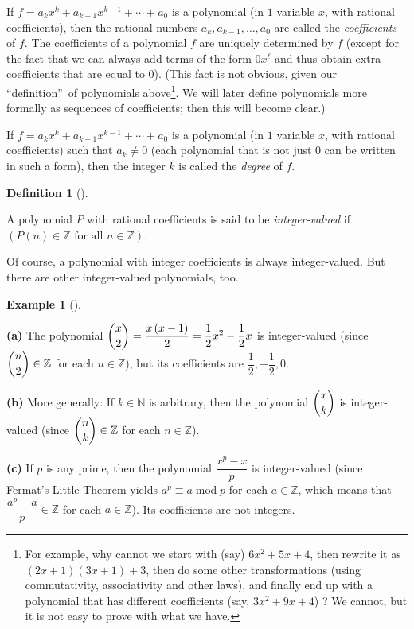 \documentclass[numbers=enddot,12pt,final,onecolumn,notitlepage]{scrartcl}%
\numberwithin{exer}{subsection}
\theoremstyle{definition}
\newtheorem{defi}[theo]{Definition}
\newenvironment{definition}[1][]
{\begin{defi}[#1]\begin{leftbar}}
{\end{leftbar}\end{defi}}
\newtheorem{exam}[theo]{Example}
\newenvironment{example}[1][]
{\begin{exam}[#1]\begin{leftbar}}
{\end{leftbar}\end{exam}}
\begin{document}
If $f=a_{k}x^{k}+a_{k-1}x^{k-1}+\cdots+a_{0}$ is a polynomial (in $1$ variable
$x$, with rational coefficients), then the rational numbers $a_{k}%
,a_{k-1},\ldots,a_{0}$ are called the \textit{coefficients} of $f$. The
coefficients of a polynomial $f$ are uniquely determined by $f$ (except for
the fact that we can always add terms of the form $0x^{\ell}$ and thus obtain
extra coefficients that are equal to $0$). (This fact is not obvious, given
our \textquotedblleft definition\textquotedblright\ of polynomials
above\footnote{For example, why cannot we start with (say) $6x^{2}+5x+4$, then
rewrite it as $\left(  2x+1\right)  \left(  3x+1\right)  +3$, then do some
other transformations (using commutativity, associativity and other laws), and
finally end up with a polynomial that has different coefficients (say,
$3x^{2}+9x+4$) ? We cannot, but it is not easy to prove with what we have.}.
We will later define polynomials more formally as sequences of coefficients;
then this will become clear.)

If $f=a_{k}x^{k}+a_{k-1}x^{k-1}+\cdots+a_{0}$ is a polynomial (in $1$ variable
$x$, with rational coefficients) such that $a_{k}\neq0$ (each polynomial that
is not just $0$ can be written in such a form), then the integer $k$ is called
the \textit{degree} of $f$.

\begin{definition}
\label{def.ivp.ivp}A polynomial $P$ with rational coefficients is said to be
\textit{integer-valued} if $\left(  P\left(  n\right)  \in\mathbb{Z}\text{ for
all }n\in\mathbb{Z}\right)  $.
\end{definition}

Of course, a polynomial with integer coefficients is always integer-valued.
But there are other integer-valued polynomials, too.

\begin{example}
\label{exa.ivp.ivps1}\textbf{(a)} The polynomial $\dbinom{x}{2}=\dfrac
{x\left(  x-1\right)  }{2}=\dfrac{1}{2}x^{2}-\dfrac{1}{2}x$ is integer-valued
(since $\dbinom{n}{2}\in\mathbb{Z}$ for each $n\in\mathbb{Z}$), but its
coefficients are $\dfrac{1}{2},-\dfrac{1}{2},0$.

\textbf{(b)} More generally: If $k\in\mathbb{N}$ is arbitrary, then the
polynomial $\dbinom{x}{k}$ is integer-valued (since $\dbinom{n}{k}%
\in\mathbb{Z}$ for each $n\in\mathbb{Z}$).

\textbf{(c)} If $p$ is any prime, then the polynomial $\dfrac{x^{p}-x}{p}$ is
integer-valued (since Fermat's Little Theorem yields $a^{p}\equiv
a\operatorname{mod}p$ for each $a\in\mathbb{Z}$, which means that
$\dfrac{a^{p}-a}{p}\in\mathbb{Z}$ for each $a\in\mathbb{Z}$). Its coefficients
are not integers.
\end{example}
\end{document}
